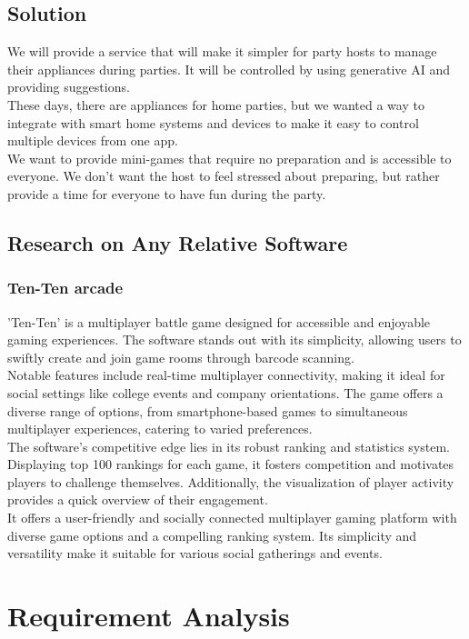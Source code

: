\documentclass[conference]{IEEEtran}
\begin{document}
    \subsection{Solution}
        We will provide a service that will make it simpler for party hosts to manage their appliances during parties. It will be controlled by using generative AI and providing suggestions.\\
        These days, there are appliances for home parties, but we wanted a way to integrate with smart home systems and devices to make it easy to control multiple devices from one app.\\
        We want to provide  mini-games that require no preparation and is accessible to everyone. We don't want the host to feel stressed about preparing, but rather provide a time for everyone to have fun during the party.

    \subsection{Research on Any Relative Software}
        \subsubsection{Ten-Ten arcade}
            'Ten-Ten' is a multiplayer battle game designed for accessible and enjoyable gaming experiences. The software stands out with its simplicity, allowing users to swiftly create and join game rooms through barcode scanning.\\
            Notable features include real-time multiplayer connectivity, making it ideal for social settings like college events and company orientations. The game offers a diverse range of options, from smartphone-based games to simultaneous multiplayer experiences, catering to varied preferences.\\
            The software's competitive edge lies in its robust ranking and statistics system. Displaying top 100 rankings for each game, it fosters competition and motivates players to challenge themselves. Additionally, the visualization of player activity provides a quick overview of their engagement.\\
            It offers a user-friendly and socially connected multiplayer gaming platform with diverse game options and a compelling ranking system. Its simplicity and versatility make it suitable for various social gatherings and events.
    \section{Requirement Analysis}
    
\end{document}

